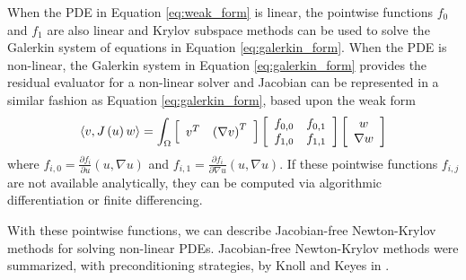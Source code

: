 When the PDE in Equation \ref{eq:weak_form} is linear, the pointwise functions $f_0$ and $f_1$ are also linear and Krylov subspace methods can be used to solve the Galerkin system of equations in Equation \ref{eq:galerkin_form}.
When the PDE is non-linear, the Galerkin system in Equation \ref{eq:galerkin_form} provides the residual evaluator for a non-linear solver and Jacobian can be represented in a similar fashion as Equation \ref{eq:galerkin_form}, based upon the weak form
\begin{equation}
\langle v, J \left( u \right) w \rangle = \int_{\Omega}
\left[ \begin{array}{c c}
v^T & \left( \nabla v \right)^T
\end{array} \right]
\left[ \begin{array}{c c}
f_{0, 0} & f_{0, 1}\\
f_{1, 0} & f_{1, 1}
\end{array} \right]
\left[ \begin{array}{c}
w \\ \nabla w
\end{array} \right]
\label{eq:jacobian_form}
\end{equation}
where $f_{i, 0} = \frac{\partial f_i}{\partial u} \left( u, \nabla u \right)$ and $f_{i, 1} = \frac{\partial f_i}{\partial \nabla u} \left( u, \nabla u \right)$.
If these pointwise functions $f_{i, j}$ are not available analytically, they can be computed via algorithmic differentiation or finite differencing.

With these pointwise functions, we can describe Jacobian-free Newton-Krylov methods for solving non-linear PDEs.
Jacobian-free Newton-Krylov methods were summarized, with preconditioning strategies, by Knoll and Keyes in \cite{knoll2004jacobian}.
